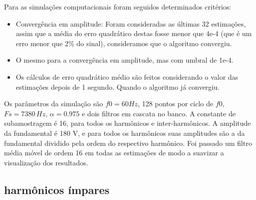 Para as simulações computacionais foram seguidos determinados critérios:

\begin{itemize}
	\item Convergência em amplitude: Foram consideradas as últimas 32 estimações, assim que a média do erro quadrático destas fosse menor que 4e-4 (que é um erro menor que 2\% do sinal), consideramos que o algoritmo convergiu.
	\item O mesmo para a convergência em amplitude, mas com umbral de 1e-4.
	\item Os cálculos de erro quadrático médio são feitos considerando o valor das estimações depois de 1 segundo. Quando o algoritmo já convergiu.
\end{itemize}

Os parâmetros da simulação são $f0=60Hz$, 128 pontos por ciclo de $f0$, $Fs=7380 \,Hz$, $\alpha=0.975$ e dois filtros em cascata no banco. A constante de subamostragem é 16, para todos os harmônicos e inter-harmônicos. A amplitude da fundamental é 180 V, e para todos os harmônicos suas amplitudes são a da fundamental dividido pela ordem do respectivo harmônico. Foi passado um filtro média móvel de ordem 16 em todas as estimações de modo a suavizar a visualização dos resultados.

\subsection{harmônicos ímpares}

